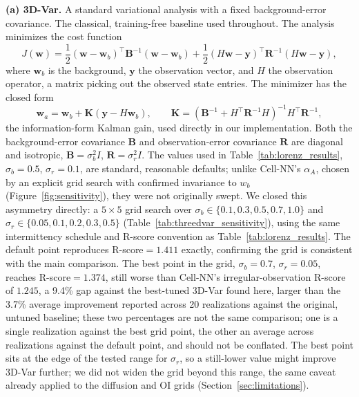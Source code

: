 \documentclass[final,5p,times,twocolumn,authoryear]{elsarticle}
\begin{document}
\textbf{(a) 3D-Var.} A standard variational analysis with a fixed
background-error covariance. The classical, training-free baseline
used throughout. The analysis minimizes the cost function
\begin{equation}
J(\mathbf{w}) = \frac{1}{2}(\mathbf{w}-\mathbf{w}_b)^\top
\mathbf{B}^{-1} (\mathbf{w}-\mathbf{w}_b) +
\frac{1}{2}(H\mathbf{w}-\mathbf{y})^\top \mathbf{R}^{-1}
(H\mathbf{w}-\mathbf{y}),
\label{eq:3dvar_cost}
\end{equation}
where $\mathbf{w}_b$ is the background, $\mathbf{y}$ the observation
vector, and $H$ the observation operator, a matrix picking out the
observed state entries. The minimizer has the closed form
\begin{equation}
\mathbf{w}_a = \mathbf{w}_b + \mathbf{K}(\mathbf{y} - H\mathbf{w}_b),
\qquad
\mathbf{K} = \left(\mathbf{B}^{-1} + H^\top \mathbf{R}^{-1}
H\right)^{-1} H^\top \mathbf{R}^{-1},
\label{eq:3dvar_gain}
\end{equation}
the information-form Kalman gain, used directly in our
implementation. Both the background-error covariance $\mathbf{B}$
and observation-error covariance $\mathbf{R}$ are diagonal and
isotropic, $\mathbf{B}=\sigma_b^2 I$, $\mathbf{R}=\sigma_r^2 I$. The
values used in Table~\ref{tab:lorenz_results}, $\sigma_b=0.5$,
$\sigma_r=0.1$, are standard, reasonable defaults; unlike Cell-NN's
$\alpha_A$, chosen by an explicit grid search with confirmed
invariance to $w_b$ (Figure~\ref{fig:sensitivity}), they were not
originally swept. We closed this asymmetry directly: a $5\times5$
grid search over $\sigma_b \in \{0.1, 0.3, 0.5, 0.7, 1.0\}$ and
$\sigma_r \in \{0.05, 0.1, 0.2, 0.3, 0.5\}$
(Table~\ref{tab:threedvar_sensitivity}), using the same intermittency
schedule and R-score convention as Table~\ref{tab:lorenz_results}.
The default point reproduces R-score$=1.411$ exactly, confirming the
grid is consistent with the main comparison. The best point in the
grid, $\sigma_b=0.7$, $\sigma_r=0.05$, reaches R-score$=1.374$, still
worse than Cell-NN's irregular-observation R-score of $1.245$, a
9.4\% gap against the best-tuned 3D-Var found here, larger than the
3.7\% average improvement reported across 20 realizations against the
original, untuned baseline; these two percentages are not the same
comparison; one is a single realization against the best grid point,
the other an average across realizations against the default point,
and should not be conflated. The best point sits at the edge of the
tested range for $\sigma_r$, so a still-lower value might improve
3D-Var further; we did not widen the grid beyond this range, the same
caveat already applied to the diffusion and OI grids
(Section~\ref{sec:limitations}).
\end{document}
